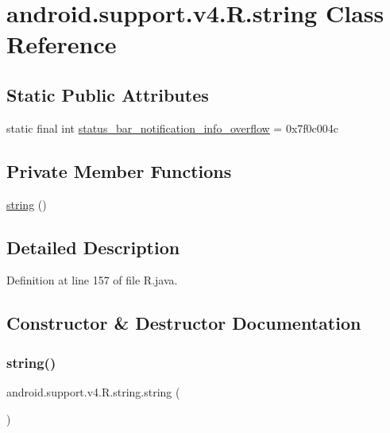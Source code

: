 \hypertarget{classandroid_1_1support_1_1v4_1_1_r_1_1string}{}\section{android.\+support.\+v4.\+R.\+string Class Reference}
\label{classandroid_1_1support_1_1v4_1_1_r_1_1string}
\subsection*{Static Public Attributes}
\begin{DoxyCompactItemize}
\item 
static final int \mbox{\hyperlink{classandroid_1_1support_1_1v4_1_1_r_1_1string_ad88576c15d5591bc789ca0c9f54796d2}{status\+\_\+bar\+\_\+notification\+\_\+info\+\_\+overflow}} = 0x7f0c004c
\end{DoxyCompactItemize}
\subsection*{Private Member Functions}
\begin{DoxyCompactItemize}
\item 
\mbox{\hyperlink{classandroid_1_1support_1_1v4_1_1_r_1_1string_ac2a7d9f630b9b28d2fd08e125169c486}{string}} ()
\end{DoxyCompactItemize}


\subsection{Detailed Description}


Definition at line 157 of file R.\+java.



\subsection{Constructor \& Destructor Documentation}
\mbox{\label{classandroid_1_1support_1_1v4_1_1_r_1_1string_ac2a7d9f630b9b28d2fd08e125169c486}} 
\subsubsection{\texorpdfstring{string()}{string()}}
{\footnotesize\ttfamily android.\+support.\+v4.\+R.\+string.\+string (\begin{DoxyParamCaption}{ }\end{DoxyParamCaption})\hspace{0.3cm}{\ttfamily [private]}}



